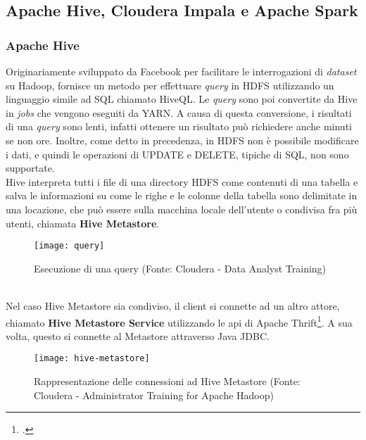 \subsection{Apache Hive, Cloudera Impala e Apache Spark}
\subsubsection{Apache Hive}
Originariamente sviluppato da Facebook per facilitare le interrogazioni di \textit{dataset} su Hadoop, fornisce un metodo per effettuare \textit{query} in HDFS utilizzando un linguaggio simile ad SQL chiamato HiveQL. 
Le \textit{query} sono poi convertite da Hive in \textit{jobs} che vengono eseguiti da YARN. A causa di questa conversione, i risultati di una \textit{query} sono lenti, infatti ottenere un risultato può richiedere anche minuti se non ore. Inoltre, come detto in precedenza, in HDFS non è possibile modificare i dati, e quindi le operazioni di UPDATE e DELETE, tipiche di SQL, non sono supportate.\\
Hive interpreta tutti i file di una directory HDFS come contenuti di una tabella e salva le informazioni su come le righe e le colonne della tabella sono delimitate in una locazione, che può essere sulla macchina locale dell'utente o condivisa fra più utenti, chiamata \textbf{Hive Metastore}.
\begin{figure}[!h]
	\centering
	\texttt{[image: query]}
	\caption{Esecuzione di una query (Fonte: Cloudera - Data Analyst Training)}
\end{figure}
\\Nel caso Hive Metastore sia condiviso, il client si connette ad un altro attore, chiamato \textbf{Hive Metastore Service} utilizzando le \gls{api} di Apache Thrift\footcite{site:thrift}. A sua volta, questo si connette al Metastore attraverso \gls{Java JDBC}.
\begin{figure}[!h]
	\centering
	\texttt{[image: hive-metastore]}
	\caption{Rappresentazione delle connessioni ad Hive Metastore (Fonte: Cloudera - Administrator Training for Apache Hadoop)}
\end{figure}

